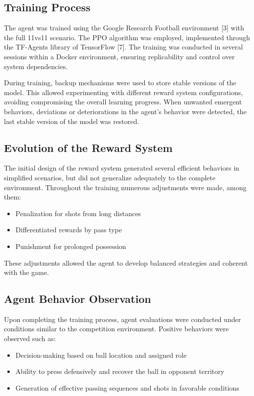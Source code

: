 \documentclass[conference]{IEEEtran}
\begin{document}
\subsection{Training Process}
The agent was trained using the Google Research Football environment [3] with the full 11vs11 scenario. The PPO algorithm was employed, implemented through the TF-Agents library of TensorFlow [7]. The training was conducted in several sessions within a Docker environment, ensuring replicability and control over system dependencies.

During training, backup mechanisms were used to store stable versions of the model. This allowed experimenting with different reward system configurations, avoiding compromising the overall learning progress. When unwanted emergent behaviors, deviations or deteriorations in the agent's behavior were detected, the last stable version of the model was restored.

\subsection{Evolution of the Reward System}
The initial design of the reward system generated several efficient behaviors in simplified scenarios, but did not generalize adequately to the complete environment. Throughout the training numerous adjustments were made, among them:

\begin{itemize}
  \item Penalization for shots from long distances
  \item Differentiated rewards by pass type
  \item Punishment for prolonged possession
\end{itemize}

These adjustments allowed the agent to develop balanced strategies and coherent with the game.

\subsection{Agent Behavior Observation}
Upon completing the training process, agent evaluations were conducted under conditions similar to the competition environment. Positive behaviors were observed such as:

\begin{itemize}
  \item Decision-making based on ball location and assigned role
  \item Ability to press defensively and recover the ball in opponent territory
  \item Generation of effective passing sequences and shots in favorable conditions
\end{itemize}
\end{document}
